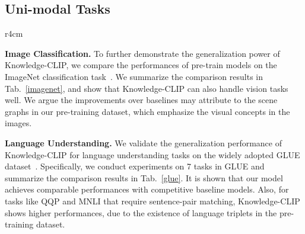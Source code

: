 \subsection{Uni-modal Tasks}
\begin{wraptable}{r}{4cm}
\vskip -0.3in
    \centering
    \caption{Fine-tuned results on ImageNet.}
    \label{imagenet}
\vskip -0.2in
\end{wraptable}

\textbf{Image Classification.} To further demonstrate the generalization power of Knowledge-CLIP, we compare the performances of pre-train models on the ImageNet classification task~\cite{imagenet}. We summarize the comparison results in Tab.~\ref{imagenet}, and show that Knowledge-CLIP can also handle vision tasks well. We argue the improvements over baselines may attribute to the scene graphs in our pre-training dataset, which emphasize the visual concepts in the images.

\textbf{Language Understanding.} We validate the generalization performance of Knowledge-CLIP for language understanding tasks on the widely adopted GLUE dataset~\cite{glue}. Specifically, we conduct experiments on 7 tasks in GLUE and summarize the comparison results in Tab.~\ref{glue}. It is shown that our model achieves comparable performances with competitive baseline models. Also, for tasks like QQP and MNLI that require sentence-pair matching, Knowledge-CLIP shows higher performances, due to the existence of language triplets in the pre-training dataset.


